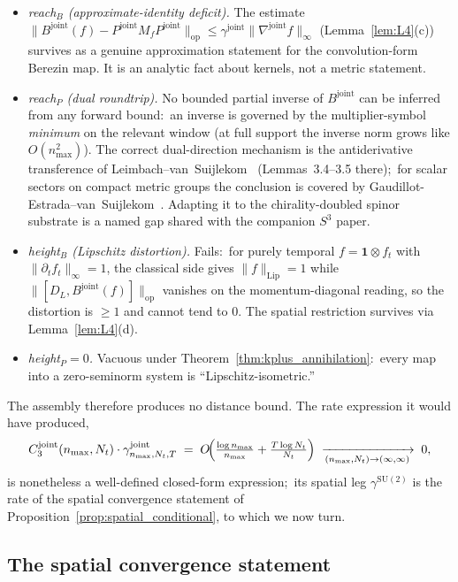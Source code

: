\documentclass[11pt,a4paper]{article}
\theoremstyle{plain}
\theoremstyle{definition}
\newcommand{\nmax}{n_{\max}}
\newcommand{\Nt}{N_{t}}
\newcommand{\sthree}{S^{3}}
\newcommand{\opnorm}[1]{\lVert #1 \rVert_{\mathrm{op}}}
\newcommand{\norm}[1]{\lVert #1 \rVert}
\newcommand{\SU}{\mathrm{SU}}
\newcommand{\DL}{D_{L}}
\newcommand{\Bjoint}{B^{\mathrm{joint}}}
\newcommand{\Pjoint}{P^{\mathrm{joint}}}
\newcommand{\gammajoint}{\gamma^{\mathrm{joint}}}
\newcommand{\gammaSU}{\gamma^{\SU(2)}}
\newcommand{\Cthreejoint}{C_{3}^{\mathrm{joint}}}
\begin{document}
\begin{itemize}
\item \emph{reach$_{B}$ (approximate-identity deficit).} The estimate
$\opnorm{\Bjoint(f) - \Pjoint M_{f} \Pjoint} \le \gammajoint
\norm{\nabla^{\mathrm{joint}} f}_{\infty}$ (Lemma~\ref{lem:L4}(c))
survives as a genuine approximation statement for the convolution-form
Berezin map. It is an analytic fact about kernels, not a metric
statement.
\item \emph{reach$_{P}$ (dual roundtrip).} No bounded partial
inverse of $\Bjoint$ can be inferred from any forward bound:\ an
inverse is governed by the multiplier-symbol \emph{minimum} on the
relevant window (at full support the inverse norm grows like
$O(\nmax^{2})$). The correct dual-direction mechanism is the
antiderivative transference of
Leimbach--van~Suijlekom~\cite{leimbach_vs2024} (Lemmas~3.4--3.5
there);\ for scalar sectors on compact metric groups the conclusion
is covered by Gaudillot-Estrada--van~Suijlekom~\cite{gaudillot_vs2023}.
Adapting it to the chirality-doubled spinor substrate is a named gap
shared with the companion $\sthree$ paper.
\item \emph{height$_{B}$ (Lipschitz distortion).} Fails:\ for
purely temporal $f = \mathbf{1} \otimes f_{t}$ with
$\norm{\partial_{t} f_{t}}_{\infty} = 1$, the classical side gives
$\norm{f}_{\mathrm{Lip}} = 1$ while $\opnorm{[\DL, \Bjoint(f)]}$
vanishes on the momentum-diagonal reading, so the distortion is
$\ge 1$ and cannot tend to $0$. The spatial restriction survives via
Lemma~\ref{lem:L4}(d).
\item \emph{height$_{P} = 0$.} Vacuous under
Theorem~\ref{thm:kplus_annihilation}:\ every map into a
zero-seminorm system is ``Lipschitz-isometric.''
\end{itemize}

The assembly therefore produces no distance bound. The rate
expression it would have produced,
\begin{equation}\label{eq:main_bound}
   \Cthreejoint(\nmax, \Nt) \cdot \gammajoint_{\nmax, \Nt, T}
   \;=\; O\!\Bigl(\tfrac{\log\nmax}{\nmax} + \tfrac{T\log\Nt}{\Nt}\Bigr)
   \;\xrightarrow[(\nmax, \Nt)\to(\infty, \infty)]{}\; 0,
\end{equation}
is nonetheless a well-defined closed-form expression;\ its spatial leg
$\gammaSU$ is the rate of the spatial convergence statement of
Proposition~\ref{prop:spatial_conditional}, to which we now turn.

\subsection{The spatial convergence statement}\label{sec:main_theorem}
\end{document}
